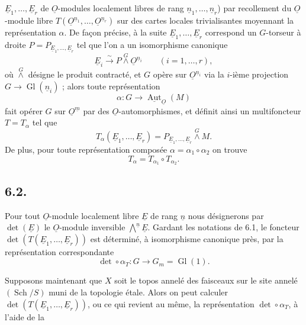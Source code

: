 \documentclass{article}
\newcommand{\Aut}{\operatorname{Aut}}
\newcommand{\Gl}{\operatorname{Gl}}
\newcommand{\Sch}{\operatorname{Sch}}
\begin{document}
\clearpage
\(\underline{E}_1,\ldots,\underline{E}_r\) de \(\underline{O}\)-modules localement libres de rang \(\underline{n}_1,\ldots,\underline{n}_r\)) par recollement du \(\underline{O}\)-module libre \(T(\underline{O}^{\underline{n}_1},\ldots,\underline{O}^{\underline{n}_r})\) sur des cartes locales trivialisantes moyennant la représentation \(\alpha\). De façon précise, à la suite \(\underline{E}_1,\ldots,\underline{E}_r\) correspond un \(G\)-torseur à droite \(P=P_{\underline{E}_1,\ldots,\underline{E}_r}\) tel que l'on a un isomorphisme canonique
\begin{equation}\tag{6.1.3}
 \underline{E}_i\xrightarrow{\sim}P\overset{G}{\wedge}\underline{O}^{\underline{n}_i}\qquad(i=1,\ldots,r),
\end{equation}
où \(\overset{G}{\wedge}\) désigne le produit contracté, et \(G\) opère sur \(\underline{O}^{\underline{n}_i}\) via la \(i\)-ième projection \(G\to\Gl(\underline{n}_i)\) ; alors toute représentation
\[
 \alpha:G\longrightarrow\underline{\Aut}_{\underline{O}}(M)
\]
fait opérer \(G\) sur \(\underline{O}^{\underline{m}}\) par des \(\underline{O}\)-automorphismes, et définit ainsi un multifoncteur \(T=T_\alpha\) tel que
\begin{equation}\tag{6.1.4}
 T_\alpha(\underline{E}_1,\ldots,\underline{E}_r)=P_{\underline{E}_1,\ldots,\underline{E}_r}\overset{G}{\wedge} M.
\end{equation}
De plus, pour toute représentation composée \(\alpha=\alpha_1\circ\alpha_2\) on trouve
\begin{equation}\tag{6.1.5}
 T_\alpha=T_{\alpha_1}\circ T_{\alpha_2}.
\end{equation}

\subsection*{6.2.}
Pour tout \(\underline{O}\)-module localement libre \(\underline{E}\) de rang \(\underline{n}\) nous désignerons par \(\det(\underline{E})\) le \(\underline{O}\)-module inversible \(\bigwedge\limits^{\underline{n}} \underline{E}\). Gardant les notations de 6.1, le foncteur \(\det(T(\underline{E}_1,\ldots,\underline{E}_r))\) est déterminé, à isomorphisme canonique près, par la représentation correspondante
\begin{equation}\tag{6.2.1}
 \det\circ\alpha_T:G\longrightarrow{G}_m=\Gl(1).
\end{equation}

Supposons maintenant que \(X\) soit le topos annelé des faisceaux sur le site annelé \((\Sch/S)\) muni de la topologie étale. Alors on peut calculer \(\det(T(\underline{E}_1,\ldots,\underline{E}_r))\), ou ce qui revient au même, la représentation \(\det\circ\alpha_T\), à l'aide de la
\end{document}

